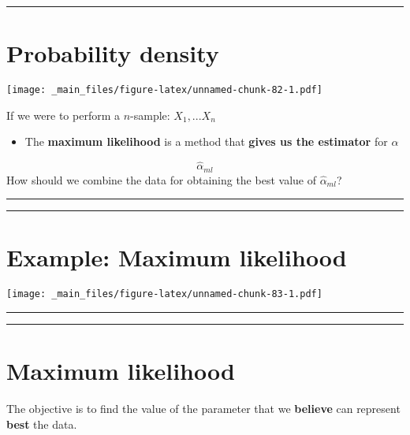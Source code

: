 \documentclass[
]{book}
\providecommand{\tightlist}{%
  \setlength{\itemsep}{0pt}\setlength{\parskip}{0pt}}
\begin{document}
\begin{center}\rule{0.5\linewidth}{0.5pt}\end{center}

\hypertarget{probability-density-1}{%
\section{Probability density}\label{probability-density-1}}

\texttt{[image: \_main\_files/figure-latex/unnamed-chunk-82-1.pdf]}

If we were to perform a \(n\)-sample: \(X_1,...X_n\)

\begin{itemize}
\tightlist
\item
  The \textbf{maximum likelihood} is a method that \textbf{gives us the estimator} for \(\alpha\)
\end{itemize}

\[\hat{\alpha}_{ml}\]
How should we combine the data for obtaining the best value of \(\hat{\alpha}_{ml}\)?

\begin{center}\rule{0.5\linewidth}{0.5pt}\end{center}

\begin{center}\rule{0.5\linewidth}{0.5pt}\end{center}

\hypertarget{example-maximum-likelihood}{%
\section{Example: Maximum likelihood}\label{example-maximum-likelihood}}

\texttt{[image: \_main\_files/figure-latex/unnamed-chunk-83-1.pdf]}

\begin{center}\rule{0.5\linewidth}{0.5pt}\end{center}

\begin{center}\rule{0.5\linewidth}{0.5pt}\end{center}

\hypertarget{maximum-likelihood-2}{%
\section{Maximum likelihood}\label{maximum-likelihood-2}}

The objective is to find the value of the parameter that we \textbf{believe} can represent \textbf{best} the data.
\end{document}
